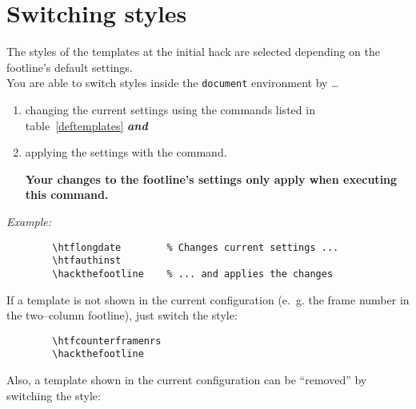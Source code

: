 \documentclass[11pt]{ltxdoc}
\newcommand{\ltxcmd}[1]{\texttt{#1}}
\begin{document}
	\section{Switching styles} \label{switchingtemplates}
	The styles of the templates at the initial hack are selected depending on the footline's default settings. \\
	You are able to switch styles inside the \texttt{document} environment by \dots
	\begin{enumerate}
		\item changing the current settings using the commands listed in table~\ref{deftemplates} \textit{\textbf{and}}
		\item applying the settings with the \ltxcmd{\hackthefootline} command. \par
			  \textbf{Your changes to the footline's settings only apply when executing this command.}
	\end{enumerate}
	
	\textit{Example:} \vspace{-.75em}
	\begin{verbatim}
		\htflongdate		% Changes current settings ...
		\htfauthinst
		\hackthefootline	% ... and applies the changes
	\end{verbatim}
	
	\bigskip
	If a template is not shown in the current configuration (e.~g. the frame number in the two--column footline), just switch the style:

	\medskip
	\vspace{-1.5em}
	\begin{verbatim}
		\htfcounterframenrs
		\hackthefootline
	\end{verbatim}
	
	
	\bigskip\bigskip
	Also, a template shown in the current configuration can be \enquote{removed} by switching the style:
	
\end{document}
